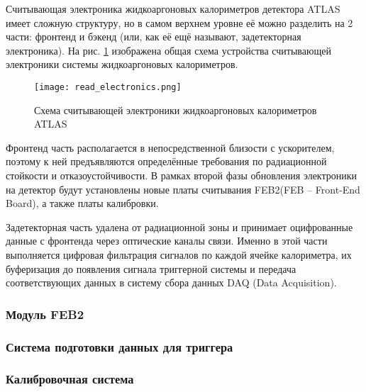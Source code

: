 Считывающая электроника жидкоаргоновых калориметров детектора ATLAS имеет сложную структуру, но в самом верхнем уровне её можно разделить на 2 части: фронтенд и бэкенд (или, как её ещё называют, задетекторная электроника). На рис. \ref{fig:read_electronics} изображена общая схема устройства считывающей электроники системы жидкоаргоновых калориметров.
\begin{figure}[ht]
    \centering
    \texttt{[image: read\_electronics.png]}
    \caption{Схема считывающей электроники жидкоаргоновых калориметров ATLAS}
    \label{fig:read_electronics}
\end{figure}\par
Фронтенд часть располагается в непосредственной близости с ускорителем, поэтому к ней предъявляются определённые требования по радиационной стойкости и отказоустойчивости. В рамках второй фазы обновления электроники на детектор будут установлены новые платы считывания FEB2(FEB -- Front-End Board), а также платы калибровки.\par
Задетекторная часть удалена от радиационной зоны и принимает оцифрованные данные с фронтенда через оптические каналы связи. Именно в этой части выполняется цифровая фильтрация сигналов по каждой ячейке калориметра, их буферизация до появления сигнала триггерной системы и передача соответствующих данных в систему сбора данных DAQ (Data Acquisition).\par

\subsubsection{Модуль FEB2}


\subsubsection{Система подготовки данных для триггера}


\subsubsection{Калибровочная система}


